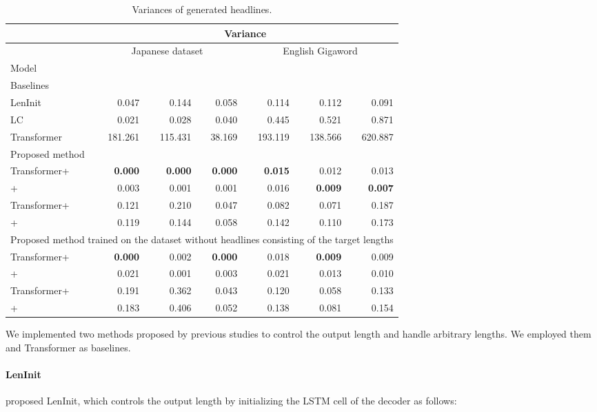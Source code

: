 \documentclass[11pt,a4paper]{article}
\begin{document}
\begin{table*}[!t]
  \centering
  \footnotesize
  \begin{tabular}{| l | r r r | r r r |} \hline
  & \multicolumn{6}{c|}{Variance} \\ \hline
  & \multicolumn{3}{c|}{Japanese dataset} & \multicolumn{3}{c|}{English Gigaword} \\ \hline
  Model &  &  &  &  &  &  \\ \hline
  \multicolumn{7}{|l|}{Baselines} \\ \hline
  LenInit & 0.047 & 0.144 & 0.058 & 0.114 & 0.112 & 0.091 \\
  LC & 0.021 & 0.028 & 0.040 & 0.445 & 0.521 & 0.871 \\
  Transformer & 181.261 & 115.431 & 38.169 & 193.119 & 138.566 & 620.887 \\ \hline
  \multicolumn{7}{|l|}{Proposed method} \\ \hline
  Transformer+ & {\bf 0.000} & {\bf 0.000} & {\bf 0.000} & {\bf 0.015} & 0.012 & 0.013 \\
  + & 0.003 & 0.001 & 0.001 & 0.016 & {\bf 0.009} & {\bf 0.007} \\
  Transformer+ & 0.121 & 0.210 & 0.047 & 0.082 & 0.071 & 0.187 \\
  + & 0.119 & 0.144 & 0.058 & 0.142 & 0.110 & 0.173 \\ \hline
  \multicolumn{7}{|l|}{Proposed method trained on the dataset without headlines consisting of the target lengths} \\ \hline
  Transformer+ & {\bf 0.000} & 0.002 & {\bf 0.000} & 0.018 & {\bf 0.009} & 0.009 \\
  + & 0.021 & 0.001 & 0.003 & 0.021 & 0.013 & 0.010 \\
  Transformer+ & 0.191 & 0.362 & 0.043 & 0.120 & 0.058 & 0.133 \\
  + & 0.183 & 0.406 & 0.052 & 0.138 & 0.081 & 0.154 \\ \hline
  \end{tabular}
  \caption{Variances of generated headlines.\label{tab:var_length}}
\end{table*}

We implemented two methods proposed by previous studies to control the output length and handle arbitrary lengths.
We employed them and Transformer as baselines.

\paragraph{LenInit}
 proposed LenInit, which controls the output length by initializing the LSTM cell  of the decoder as follows:
\end{document}
